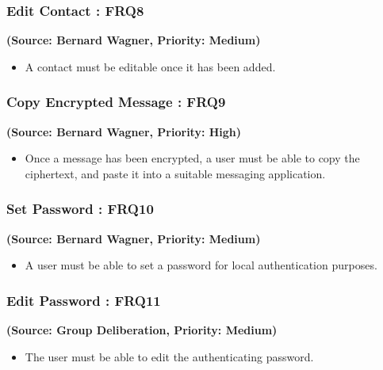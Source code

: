 \subsubsection{Edit Contact : FRQ8}
\textbf{(Source: Bernard Wagner, Priority: Medium)}
\begin{itemize}
\item A contact must be editable once it has been added.
\end{itemize}
\subsubsection{Copy Encrypted Message : FRQ9}
\textbf{(Source: Bernard Wagner, Priority: High)}
\begin{itemize}
\item Once a message has been encrypted, a user must be able to copy the ciphertext, and paste it into a suitable messaging application.
\end{itemize}
\subsubsection{Set Password : FRQ10}
\textbf{(Source: Bernard Wagner, Priority: Medium)}
\begin{itemize}
\item A user must be able to set a password for local authentication purposes.
\end{itemize}
\subsubsection{Edit Password : FRQ11}
\textbf{(Source: Group Deliberation, Priority: Medium)}
\begin{itemize}
\item The user must be able to edit the authenticating password.
\end{itemize}